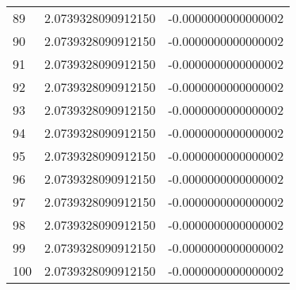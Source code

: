 \begin{tabular}{lrr}
89 & 2.0739328090912150 & -0.0000000000000002 \\
90 & 2.0739328090912150 & -0.0000000000000002 \\
91 & 2.0739328090912150 & -0.0000000000000002 \\
92 & 2.0739328090912150 & -0.0000000000000002 \\
93 & 2.0739328090912150 & -0.0000000000000002 \\
94 & 2.0739328090912150 & -0.0000000000000002 \\
95 & 2.0739328090912150 & -0.0000000000000002 \\
96 & 2.0739328090912150 & -0.0000000000000002 \\
97 & 2.0739328090912150 & -0.0000000000000002 \\
98 & 2.0739328090912150 & -0.0000000000000002 \\
99 & 2.0739328090912150 & -0.0000000000000002 \\
100 & 2.0739328090912150 & -0.0000000000000002 \\
\end{tabular}
